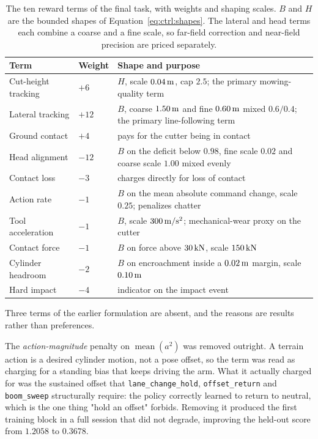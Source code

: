 \begin{table}[tb]
  \centering
  \caption{The ten reward terms of the final \ppoROM{} task, with weights and
  shaping scales. $B$ and $H$ are the bounded shapes of
  Equation~\eqref{eq:ctrl:shapes}. The lateral and head terms each combine a
  coarse and a fine scale, so far-field correction and near-field precision are
  priced separately.}
  \label{tab:ctrl:reward}
  \small
  \begin{tabular}{llp{6.0cm}}
    \toprule
    Term & Weight & Shape and purpose \\
    \midrule
    Cut-height tracking & $+6$   & $H$, scale $\unit[0.04]{m}$, cap $2.5$; the
      primary mowing-quality term \\
    Lateral tracking    & $+12$  & $B$, coarse $\unit[1.50]{m}$ and fine
      $\unit[0.60]{m}$ mixed $0.6/0.4$; the primary line-following term \\
    Ground contact      & $+4$   & pays for the cutter being in contact \\
    Head alignment      & $-12$  & $B$ on the deficit below $0.98$, fine scale
      $0.02$ and coarse scale $1.00$ mixed evenly \\
    Contact loss        & $-3$   & charges directly for loss of contact \\
    Action rate         & $-1$   & $B$ on the mean absolute command change,
      scale $0.25$; penalizes chatter \\
    Tool acceleration   & $-1$   & $B$, scale $\unit[300]{m/s^2}$;
      mechanical-wear proxy on the cutter \\
    Contact force       & $-1$   & $B$ on force above $\unit[30]{kN}$, scale
      $\unit[150]{kN}$ \\
    Cylinder headroom   & $-2$   & $B$ on encroachment inside a
      $\unit[0.02]{m}$ margin, scale $\unit[0.10]{m}$ \\
    Hard impact         & $-4$   & indicator on the impact event \\
    \bottomrule
  \end{tabular}
\end{table}

Three terms of the earlier formulation are absent, and the reasons are results
rather than preferences.

The \emph{action-magnitude} penalty on $\operatorname{mean}(a^2)$ was removed
outright. A terrain action is a desired cylinder motion, not a pose offset, so
the term was read as charging for a standing bias that keeps driving the arm.
What it actually charged for was the sustained offset that
\texttt{lane\_change\_hold}, \texttt{offset\_return} and \texttt{boom\_sweep}
structurally require: the policy correctly learned to return to neutral, which
is the one thing "hold an offset" forbids. Removing it produced the first
training block in a full session that did not degrade, improving the held-out
score from $1.2058$ to $0.3678$.

